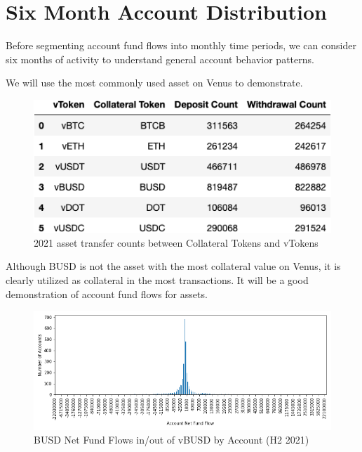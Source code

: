 \documentclass[12pt]{article}
\begin{document}
    \section*{Six Month Account Distribution}
        Before segmenting account fund flows into monthly time periods, we can consider six months of activity to understand general account behavior patterns.

        We will use the most commonly used asset on Venus to demonstrate.
        \begin{figure}[h]
            \caption{2021 asset transfer counts between Collateral Tokens and vTokens \label{overflow}}
            \centering
            \hspace*{0in}
            \includegraphics[width=0.5\paperwidth]{transfer-count.png}
        \end{figure}

        Although BUSD is not the asset with the most collateral value on Venus, it is clearly utilized as collateral in the most transactions. It will be a good demonstration of account fund flows for assets.
        \clearpage

        \begin{figure}[h]
            \caption{BUSD Net Fund Flows in/out of vBUSD by Account (H2 2021) \label{overflow}}
            \centering
            \hspace*{-1in}
            \includegraphics[width=0.8\paperwidth]{net-fundflow-accountdist-busd-H2-2021.png}
        \end{figure}
\end{document}

